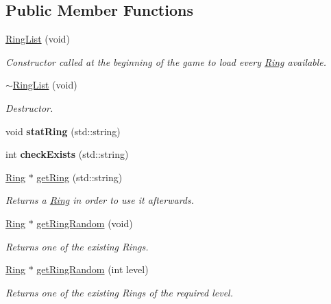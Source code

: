 \subsection*{Public Member Functions}
\begin{DoxyCompactItemize}
\item 
\hyperlink{class_ring_list_a6c429f849cd83b3939210ef81061f87a}{Ring\+List} (void)
\begin{DoxyCompactList}\small\item\em Constructor called at the beginning of the game to load every \hyperlink{class_ring}{Ring} available. \end{DoxyCompactList}\item 
\hyperlink{class_ring_list_ac9125c89e57306e50f3f8a669b3601c8}{$\sim$\+Ring\+List} (void)
\begin{DoxyCompactList}\small\item\em Destructor. \end{DoxyCompactList}\item 
\hypertarget{class_ring_list_a7157922eb2786a3d915fbc6316ba9224}{void {\bfseries stat\+Ring} (std\+::string)}\label{class_ring_list_a7157922eb2786a3d915fbc6316ba9224}

\item 
\hypertarget{class_ring_list_a1c1c0f7d1e044121a684c89479d85464}{int {\bfseries check\+Exists} (std\+::string)}\label{class_ring_list_a1c1c0f7d1e044121a684c89479d85464}

\item 
\hyperlink{class_ring}{Ring} $\ast$ \hyperlink{class_ring_list_a4f47c77eb2eb96f7586da407186dc0ee}{get\+Ring} (std\+::string)
\begin{DoxyCompactList}\small\item\em Returns a \hyperlink{class_ring}{Ring} in order to use it afterwards. \end{DoxyCompactList}\item 
\hyperlink{class_ring}{Ring} $\ast$ \hyperlink{class_ring_list_ae754467b19079c0355a2628d6a7480cf}{get\+Ring\+Random} (void)
\begin{DoxyCompactList}\small\item\em Returns one of the existing Rings. \end{DoxyCompactList}\item 
\hyperlink{class_ring}{Ring} $\ast$ \hyperlink{class_ring_list_ae9ed241a2a5132144d058ed98cd5eb6a}{get\+Ring\+Random} (int level)
\begin{DoxyCompactList}\small\item\em Returns one of the existing Rings of the required level. \end{DoxyCompactList}\end{DoxyCompactItemize}
